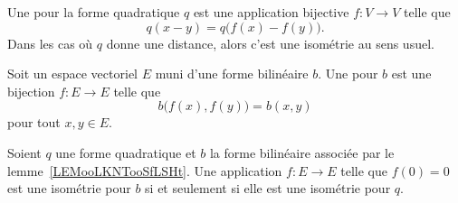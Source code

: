 \begin{definition}      \label{DEFooECTUooRxBhHf}
	Une  pour la forme quadratique \( q\) est une application bijective \( f\colon V\to V\) telle que
	\begin{equation}
		q(x-y)=q\big( f(x)-f(y) \big).
	\end{equation}
	Dans les cas où \( q\) donne une distance, alors c'est une isométrie au sens usuel.
\end{definition}

\begin{definition}      \label{DEFooIQURooMeQuqX}
	Soit un espace vectoriel \( E\) muni d'une forme bilinéaire \( b\). Une  pour \( b\) est une bijection \( f\colon E\to E\) telle que
	\begin{equation}
		b\big( f(x),f(y) \big)=b(x,y)
	\end{equation}
	pour tout \( x,y\in E\).
\end{definition}

\begin{lemma}   \label{LemewGJmM}
	Soient \( q\) une forme quadratique et \( b\) la forme bilinéaire associée par le lemme~\ref{LEMooLKNTooSfLSHt}. Une application \( f\colon E\to E\) telle que \( f(0)=0\) est une isométrie pour \( b\) si et seulement si elle est une isométrie pour \( q\).
\end{lemma}

